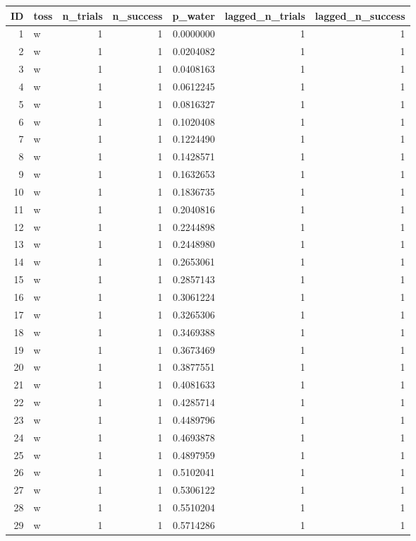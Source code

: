 \documentclass[
  letterpaper,
  DIV=11,
  numbers=noendperiod]{scrreprt}
\begin{document}
\begin{table}
\centering
\begin{tabular}[t]{r|l|r|r|r|r|r}
\hline
ID & toss & n\_trials & n\_success & p\_water & lagged\_n\_trials & lagged\_n\_success\\
\hline
1 & w & 1 & 1 & 0.0000000 & 1 & 1\\
\hline
2 & w & 1 & 1 & 0.0204082 & 1 & 1\\
\hline
3 & w & 1 & 1 & 0.0408163 & 1 & 1\\
\hline
4 & w & 1 & 1 & 0.0612245 & 1 & 1\\
\hline
5 & w & 1 & 1 & 0.0816327 & 1 & 1\\
\hline
6 & w & 1 & 1 & 0.1020408 & 1 & 1\\
\hline
7 & w & 1 & 1 & 0.1224490 & 1 & 1\\
\hline
8 & w & 1 & 1 & 0.1428571 & 1 & 1\\
\hline
9 & w & 1 & 1 & 0.1632653 & 1 & 1\\
\hline
10 & w & 1 & 1 & 0.1836735 & 1 & 1\\
\hline
11 & w & 1 & 1 & 0.2040816 & 1 & 1\\
\hline
12 & w & 1 & 1 & 0.2244898 & 1 & 1\\
\hline
13 & w & 1 & 1 & 0.2448980 & 1 & 1\\
\hline
14 & w & 1 & 1 & 0.2653061 & 1 & 1\\
\hline
15 & w & 1 & 1 & 0.2857143 & 1 & 1\\
\hline
16 & w & 1 & 1 & 0.3061224 & 1 & 1\\
\hline
17 & w & 1 & 1 & 0.3265306 & 1 & 1\\
\hline
18 & w & 1 & 1 & 0.3469388 & 1 & 1\\
\hline
19 & w & 1 & 1 & 0.3673469 & 1 & 1\\
\hline
20 & w & 1 & 1 & 0.3877551 & 1 & 1\\
\hline
21 & w & 1 & 1 & 0.4081633 & 1 & 1\\
\hline
22 & w & 1 & 1 & 0.4285714 & 1 & 1\\
\hline
23 & w & 1 & 1 & 0.4489796 & 1 & 1\\
\hline
24 & w & 1 & 1 & 0.4693878 & 1 & 1\\
\hline
25 & w & 1 & 1 & 0.4897959 & 1 & 1\\
\hline
26 & w & 1 & 1 & 0.5102041 & 1 & 1\\
\hline
27 & w & 1 & 1 & 0.5306122 & 1 & 1\\
\hline
28 & w & 1 & 1 & 0.5510204 & 1 & 1\\
\hline
29 & w & 1 & 1 & 0.5714286 & 1 & 1\\

\end{tabular}
\end{table}
\end{document}
